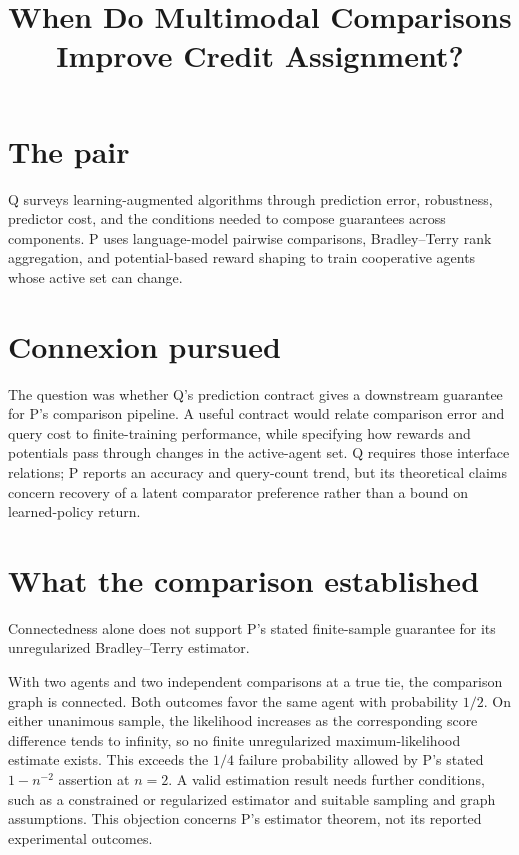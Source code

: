 \documentclass{article}
\title{When Do Multimodal Comparisons Improve Credit Assignment?}
\begin{document}
\maketitle

\section{The pair}

Q surveys learning-augmented algorithms through prediction error, robustness, predictor cost, and the conditions needed to compose guarantees across components. P uses language-model pairwise comparisons, Bradley--Terry rank aggregation, and potential-based reward shaping to train cooperative agents whose active set can change. 

\section{Connexion pursued}

The question was whether Q's prediction contract gives a downstream guarantee for P's comparison pipeline. A useful contract would relate comparison error and query cost to finite-training performance, while specifying how rewards and potentials pass through changes in the active-agent set. Q requires those interface relations; P reports an accuracy and query-count trend, but its theoretical claims concern recovery of a latent comparator preference rather than a bound on learned-policy return. 

\section{What the comparison established}

\begin{claim}
Connectedness alone does not support P's stated finite-sample guarantee for its unregularized Bradley--Terry estimator.
\end{claim}
With two agents and two independent comparisons at a true tie, the comparison graph is connected. Both outcomes favor the same agent with probability \(1/2\). On either unanimous sample, the likelihood increases as the corresponding score difference tends to infinity, so no finite unregularized maximum-likelihood estimate exists. This exceeds the \(1/4\) failure probability allowed by P's stated \(1-n^{-2}\) assertion at \(n=2\). A valid estimation result needs further conditions, such as a constrained or regularized estimator and suitable sampling and graph assumptions. This objection concerns P's estimator theorem, not its reported experimental outcomes. 
\end{document}

